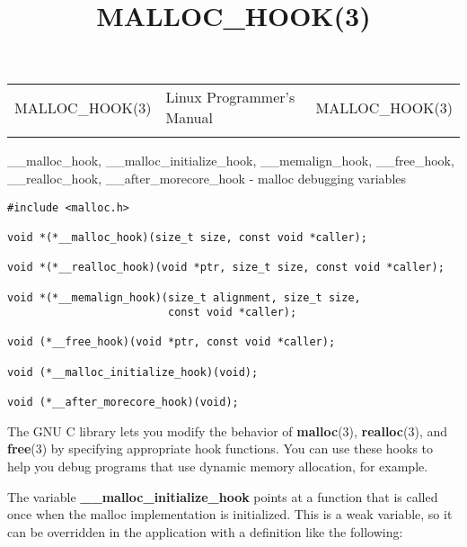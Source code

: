 \documentclass[]{article}
\title{MALLOC\_HOOK(3)}
\author{}
\date{}
\let\realtextbf=\textbf
\renewcommand{\textbf}[1]{\textcolor{boldcolor}{\realtextbf{#1}}}
\begin{document}
\maketitle

\begin{longtable}[c]{@{}lll@{}}
\toprule\addlinespace
MALLOC\_HOOK(3) & Linux Programmer's Manual & MALLOC\_HOOK(3)
\\\addlinespace
\bottomrule
\end{longtable}


\_\_malloc\_hook, \_\_malloc\_initialize\_hook, \_\_memalign\_hook,
\_\_free\_hook, \_\_realloc\_hook, \_\_after\_morecore\_hook - malloc
debugging variables


\begin{verbatim}
#include <malloc.h>
 
void *(*__malloc_hook)(size_t size, const void *caller);
 
void *(*__realloc_hook)(void *ptr, size_t size, const void *caller);
 
void *(*__memalign_hook)(size_t alignment, size_t size,
                         const void *caller);
 
void (*__free_hook)(void *ptr, const void *caller);
 
void (*__malloc_initialize_hook)(void);
 
void (*__after_morecore_hook)(void);
\end{verbatim}


The GNU C library lets you modify the behavior of \textbf{malloc}(3),
\textbf{realloc}(3), and \textbf{free}(3) by specifying appropriate hook
functions. You can use these hooks to help you debug programs that use
dynamic memory allocation, for example.

The variable \textbf{\_\_malloc\_initialize\_hook} points at a function
that is called once when the malloc implementation is initialized. This
is a weak variable, so it can be overridden in the application with a
definition like the following:
\end{document}

